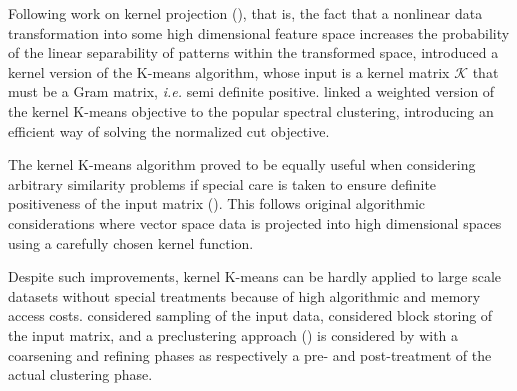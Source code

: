 \documentclass[a4paper,twoside]{article}
\begin{document}
Following work on kernel projection (\cite{Vapnik:1995:NSL:211359}), that is, the fact that a nonlinear data transformation into some high dimensional feature space increases the probability of the linear separability of patterns within the transformed space, \cite{Girolami:2002:MKC:2325785.2326903} introduced a kernel version of the K-means algorithm, whose input is a kernel matrix $\mathcal{K}$ that must be a Gram matrix, \textit{i.e.} semi definite positive. \cite{Dhillon:2007:WGC:1313055.1313291} linked a weighted version of the kernel K-means objective to the popular spectral clustering, introducing an efficient way of solving the normalized cut objective.

The kernel K-means algorithm proved to be equally useful when considering arbitrary similarity problems if special care is taken to ensure definite positiveness of the input matrix (\cite{Roth:2003:OCP:960254.960291}). This follows original algorithmic considerations where vector space data is projected into high dimensional spaces using a carefully chosen kernel function. 


Despite such improvements, kernel K-means can be hardly applied to large scale datasets without special treatments because of high algorithmic and memory access costs. 
\cite{Chitta:2011:AKK:2020408.2020558} considered sampling of the input data, \cite{1047453} considered block storing of the input matrix, and a preclustering  approach (\cite{bradley98scaling, conf/icde/GantiRGPF99}) is considered by \cite{Kulis2008} with a coarsening and refining phases as respectively a pre- and post-treatment of the actual clustering phase.
\end{document}
